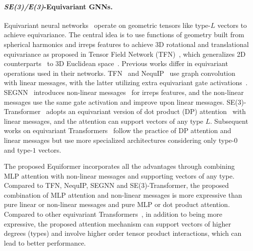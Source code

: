 \paragraph{\textit{SE(3)/E(3)}-Equivariant GNNs.}
\vspace{-2.5mm}
Equivariant neural networks~\citep{tfn, kondor2018clebsch, 3dsteerable, se3_transformer, l1net, geometric_prediction, nequip, gvp, painn, egnn, se3_wavefunction, segnn, torchmd_net, eqgat, allergo} operate on geometric tensors like type-$L$ vectors to achieve equivariance.
The central idea is to use functions of geometry built from spherical harmonics and irreps features to achieve 3D rotational and translational equivariance as proposed in Tensor Field Network (TFN)~\citep{tfn}, which generalizes 2D counterparts~\citep{harmonis_network, group_equivariant_convolution_networks, spherical_cnn} to 3D Euclidean space~\citep{tfn, 3dsteerable, kondor2018clebsch}.
Previous works differ in equivariant operations used in their networks.
TFN~\citep{tfn} and NequIP~\citep{nequip} use graph convolution with linear messages, with the latter utilizing extra equivariant gate activations~\citep{3dsteerable}.
SEGNN~\citep{segnn} introduces non-linear messages~\citep{neural_message_passing_quantum_chemistry, gns} for irreps features, and the non-linear messages use the same gate activation and improve upon linear messages. 
SE(3)-Transformer~\citep{se3_transformer} adopts an equivariant version of dot product (DP)  attention~\citep{transformer} with linear messages, and the attention can support vectors of any type $L$.
Subsequent works on equivariant Transformers~\citep{torchmd_net, eqgat} follow the practice of DP attention and linear messages but use more specialized architectures considering only type-$0$ and type-$1$ vectors.

\vspace{-1.5mm}
The proposed Equiformer incorporates all the advantages through combining MLP attention with non-linear messages and supporting vectors of any type.
Compared to TFN, NequIP, SEGNN and SE(3)-Transformer, the proposed combination of MLP attention and non-linear messages is more expressive than pure linear or non-linear messages and pure MLP or dot product attention.
Compared to other equivariant Transformers~\citep{torchmd_net, eqgat}, in addition to being more expressive, the proposed attention mechanism can support vectors of higher degrees (types) and involve higher order tensor product interactions, which can lead to better performance. %


